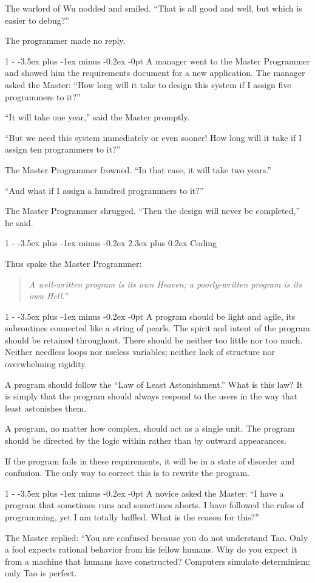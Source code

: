 \documentclass[12pt,letterpaper]{article}
\makeatletter
\newlength{\intomargin}\setlength{\intomargin}{25pt}
\renewcommand{\section}{%
\@startsection{section}%
{1}%
{-\intomargin}%
{-3.5ex plus -1ex minus -0.2ex}%
{2.3ex plus 0.2ex}%
{\normalfont\Large\bfseries}%
}
\renewcommand{\subsection}{%
\@startsection{subsection}%
{1}%
{-\intomargin}%
{-3.5ex plus -1ex minus -0.2ex}%
{-0pt}%
{\normalfont\large\bfseries}%
}
\newcommand{\book}[2]{\section{#1}\par\hspace{-\intomargin}Thus spake the Master Programmer:%
\begin{quotation}\noindent\llap{``}\textsl{#2}''\end{quotation}\medskip}
\newcommand{\sect}{\subsection{}}
\makeatother
\begin{document}
The warlord of Wu nodded and smiled. ``That is all good and well, but
which is easier to debug?''

The programmer made no reply.

\sect
A manager went to the Master Programmer and showed him the
requirements document for a new application. The manager asked the
Master: ``How long will it take to design this system if I assign five
programmers to it?''

``It will take one year,'' said the Master promptly.

``But we need this system immediately or even sooner! How long will it
take if I assign ten programmers to it?''

The Master Programmer frowned. ``In that case, it will take two years.''

``And what if I assign a hundred programmers to it?''

The Master Programmer shrugged. ``Then the design will never be
completed,'' he said.

\book{Coding}%
{A well-written program is its own Heaven; a poorly-written
program is its own Hell.}

\sect
A program should be light and agile, its subroutines connected like a
string of pearls. The spirit and intent of the program should be
retained throughout. There should be neither too little nor too
much. Neither needless loops nor useless variables; neither lack of
structure nor overwhelming rigidity.

A program should follow the ``Law of Least Astonishment.'' What is
this law? It is simply that the program should always respond to the
users in the way that least astonishes them.

A program, no matter how complex, should act as a single unit. The
program should be directed by the logic within rather than by outward
appearances.

If the program fails in these requirements, it will be in a state of
disorder and confusion. The only way to correct this is to rewrite the
program.

\sect
A novice asked the Master: ``I have a program that sometimes runs and
sometimes aborts. I have followed the rules of programming, yet I am
totally baffled. What is the reason for this?''

The Master replied: ``You are confused because you do not understand
Tao. Only a fool expects rational behavior from his fellow humans. Why
do you expect it from a machine that humans have constructed?
Computers simulate determinism; only Tao is perfect.
\end{document}
